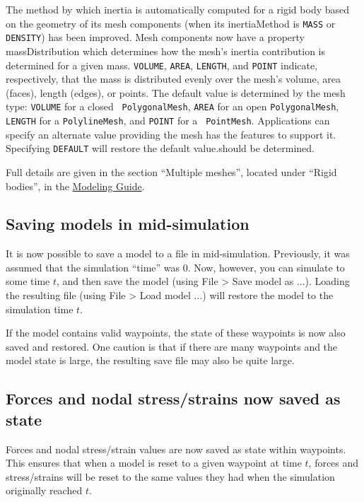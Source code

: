 \documentclass{article}
\begin{document}
The method by which inertia is automatically computed for a rigid body
based on the geometry of its mesh components (when its {\sf
inertiaMethod} is {\tt MASS} or {\tt DENSITY}) has been improved.
Mesh components now have a property {\sf massDistribution} which
determines how the mesh's inertia contribution is determined for a
given mass.  {\tt VOLUME}, {\tt AREA}, {\tt LENGTH}, and {\tt POINT}
indicate, respectively, that the mass is distributed evenly over the
mesh's volume, area (faces), length (edges), or points. The default
value is determined by the mesh type: {\tt VOLUME} for a closed {\tt
PolygonalMesh}, {\tt AREA} for an open {\tt PolygonalMesh}, {\tt
LENGTH} for a {\tt PolylineMesh}, and {\tt POINT} for a {\tt
PointMesh}. Applications can specify an alternate value providing the
mesh has the features to support it. Specifying {\tt DEFAULT} will
restore the default value.should be determined.

Full details are given in the section ``Multiple meshes'',
located under ``Rigid bodies'', in the
\href{http://www.artisynth.org/doc/info/modelguide/modelguide.html}
{Modeling Guide}.

\subsection*{Saving models in mid-simulation}

It is now possible to save a model to a file in mid-simulation.
Previously, it was assumed that the simulation ``time'' was 0.  Now,
however, you can simulate to some time $t$, and then save the model
(using {\sf File > Save model as ...}). Loading the resulting file
(using {\sf File > Load model ...}) will restore the model to the
simulation time $t$.

If the model contains valid waypoints, the state of these waypoints is
now also saved and restored. One caution is that if there are many
waypoints and the model state is large, the resulting save file may
also be quite large.

\subsection*{Forces and nodal stress/strains now saved as
state}

Forces and nodal stress/strain values are now saved as state within
waypoints.  This ensures that when a model is reset to a given
waypoint at time $t$, forces and stress/strains will be reset to the
same values they had when the simulation originally reached $t$.
\end{document}
